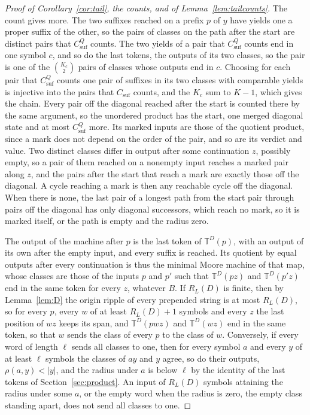 \documentclass[11pt,a4paper]{article}
\theoremstyle{definition}
\theoremstyle{plain}
\newcommand{\T}{\mathbb{T}}
\newcommand{\ripple}{R_{L}}
\begin{document}
\begin{proof}[Proof of Corollary~\ref{cor:tail}, the counts, and of Lemma~\ref{lem:tailcounts}]
The count gives more. The two suffixes reached on a prefix \(p\) of \(y\) have yields one a proper suffix of the other,
so the pairs of classes on the path after the start are distinct pairs that \(C^{Q}_{\mathrm{suf}}\) counts. The two
yields of a pair that \(C^{Q}_{\mathrm{suf}}\) counts end in one symbol \(c\), and so do the last tokens, the outputs of
its two classes, so the pair is one of the \(\binom{K_c}{2}\) pairs of classes whose outputs end in \(c\). Choosing for
each pair that \(C^{Q}_{\mathrm{suf}}\) counts one pair of suffixes in its two classes with comparable yields is
injective into the pairs that \(C_{\mathrm{suf}}\) counts, and the \(K_c\) sum to \(K - 1\), which gives the chain.
Every pair off the diagonal reached after the start is counted there by the same argument, so the unordered product has
the start, one merged diagonal state and at most \(C^{Q}_{\mathrm{suf}}\) more. Its marked inputs are those of the
quotient product, since a mark does not depend on the order of the pair, and so are its verdict and value. Two distinct
classes differ in output after some continuation \(z\), possibly empty, so a pair of them reached on a nonempty input
reaches a marked pair along \(z\), and the pairs after the start that reach a mark are exactly those off the diagonal. A
cycle reaching a mark is then any reachable cycle off the diagonal. When there is none, the last pair of a longest path
from the start pair through pairs off the diagonal has only diagonal successors, which reach no mark, so it is marked
itself, or the path is empty and the radius zero.

The output of the machine after \(p\) is the last token of \(\T^D(p)\), with an output of its own after the empty input,
and every suffix is reached. Its quotient by equal outputs after every continuation is thus the minimal Moore machine of
that map, whose classes are those of the inputs \(p\) and \(p'\) such that \(\T^D(pz)\) and \(\T^D(p'z)\) end in the
same token for every \(z\), whatever \(B\). If \(\ripple(D)\) is finite, then by Lemma~\ref{lem:D} the origin ripple of
every prepended string is at most \(\ripple(D)\), so for every \(p\), every \(w\) of at least \(\ripple(D) + 1\) symbols
and every \(z\) the last position of \(wz\) keeps its span, and \(\T^D(pwz)\) and \(\T^D(wz)\) end in the same token, so
that \(w\) sends the class of every \(p\) to the class of \(w\). Conversely, if every word of length \(\ell\) sends all
classes to one, then for every symbol \(a\) and every \(y\) of at least \(\ell\) symbols the classes of \(ay\) and \(y\)
agree, so do their outputs, \(\rho(a, y) < |y|\), and the radius under \(a\) is below \(\ell\) by the identity of the
last tokens of Section~\ref{sec:product}. An input of \(\ripple(D)\) symbols attaining the radius under some \(a\), or
the empty word when the radius is zero, the empty class standing apart, does not send all classes to one.


\end{proof}
\end{document}
